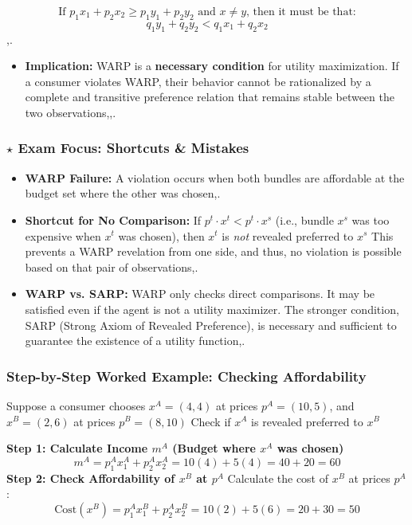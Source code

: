 \documentclass{article}
\begin{document}
\[\text{If } p_1 x_1 + p_2 x_2 \geq p_1 y_1 + p_2 y_2 \text{ and } x \neq y \text{, then it must be that:}\]
\[q_1 y_1 + q_2 y_2 < q_1 x_1 + q_2 x_2\],.

\begin{itemize}
    \item \textbf{Implication:} WARP is a \textbf{necessary condition} for utility maximization. If a consumer violates WARP, their behavior cannot be rationalized by a complete and transitive preference relation that remains stable between the two observations,,.
\end{itemize}

\subsubsection*{$\star$ Exam Focus: Shortcuts \& Mistakes}
\begin{itemize}
    \item \textbf{WARP Failure:} A violation occurs when both bundles are affordable at the budget set where the other was chosen,.
    \item \textbf{Shortcut for No Comparison:} If $p^t \cdot x^t < p^t \cdot x^s$ (i.e., bundle $x^s$ was too expensive when $x^t$ was chosen), then $x^t$ is \textit{not} revealed preferred to $x^s$ This prevents a WARP revelation from one side, and thus, no violation is possible based on that pair of observations,.
    \item \textbf{WARP vs. SARP:} WARP only checks direct comparisons. It may be satisfied even if the agent is not a utility maximizer. The stronger condition, SARP (Strong Axiom of Revealed Preference), is necessary and sufficient to guarantee the existence of a utility function,.
\end{itemize}

\hrulefill\vspace{2ex}

\subsubsection*{Step-by-Step Worked Example: Checking Affordability}

Suppose a consumer chooses $x^A=(4, 4)$ at prices $p^A=(10, 5)$, and $x^B=(2, 6)$ at prices $p^B=(8, 10)$ Check if $x^A$ is revealed preferred to $x^B$

\textbf{Step 1: Calculate Income $m^A$ (Budget where $x^A$ was chosen)}
\[ m^A = p_1^A x_1^A + p_2^A x_2^A = 10(4) + 5(4) = 40 + 20 = 60 \]
\textbf{Step 2: Check Affordability of $x^B$ at $p^A$}
Calculate the cost of $x^B$ at prices $p^A$:
\[ \text{Cost}(x^B) = p_1^A x_1^B + p_2^A x_2^B = 10(2) + 5(6) = 20 + 30 = 50 \]
\end{document}
